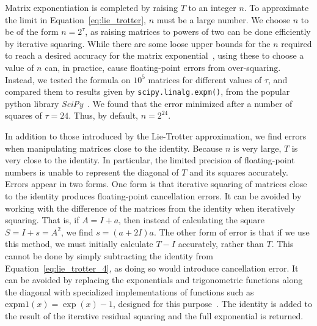 \documentclass{jors}
\begin{document}
		Matrix exponentiation is completed by raising $ T $ to an integer $ n $.
		To approximate the limit in Equation~\eqref{eq:lie_trotter}, $ n $ must be a large number.
		We choose $ n $ to be of the form $ n = 2^\tau $, as raising matrices to powers of two can be done efficiently by iterative squaring.
		While there are some loose upper bounds for the $ n $ required to reach a desired accuracy for the matrix exponential~\cite{suzuki_generalized_1976}, using these to choose a value of $ n $ can, in practice, cause floating-point errors from over-squaring.
		Instead, we tested the formula on $ 10^5 $ matrices for different values of $ \tau $, and compared them to results given by \texttt{scipy.linalg.expm()}, from the popular python library \emph{SciPy}~\cite{virtanen_scipy_2020}.
		We found that the error minimized after a number of squares of $ \tau = 24 $.
		Thus, by default, $ n = 2^{24} $.

		In addition to those introduced by the Lie-Trotter approximation, we find errors when manipulating matrices close to the identity.
		Because $ n $ is very large, $ T $ is very close to the identity.
		In particular, the limited precision of floating-point numbers is unable to represent the diagonal of $ T $ and its squares accurately.
		Errors appear in two forms.
		One form is that iterative squaring of matrices close to the identity produces floating-point cancellation errors.
		It can be avoided by working with the difference of the matrices from the identity when iteratively squaring.
		That is, if $ A = I + a $, then instead of calculating the square $ S = I + s = A^2 $, we find $ s = (a + 2I)a $.
		The other form of error is that if we use this method, we must initially calculate $ T - I $ accurately, rather than $ T $.
		This cannot be done by simply subtracting the identity from Equation~\eqref{eq:lie_trotter_4}, as doing so would introduce cancellation error.
		It can be avoided by replacing the exponentials and trigonometric functions along the diagonal with specialized implementations of functions such as $ \text{expm}1(x) = \exp(x) - 1 $, designed for this purpose~\cite{hewlett-packard_hp_1994}.
		The identity is added to the result of the iterative residual squaring and the full exponential is returned.
		
\end{document}
